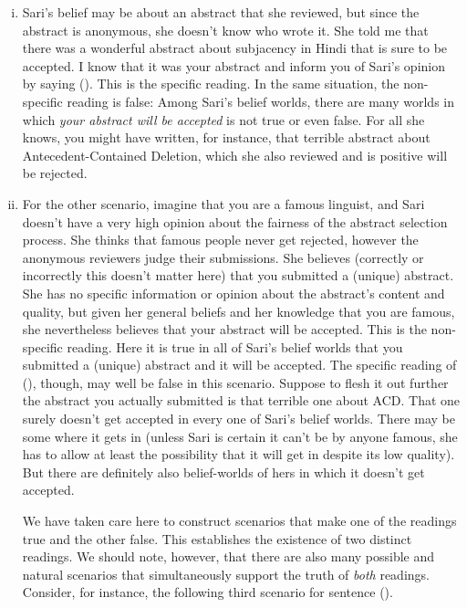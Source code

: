 \begin{enumerate}[(i)]
	
\item Sari's belief may be about an abstract that she reviewed, but since the
  abstract is anonymous, she doesn't know who wrote it. She told me that there
  was a wonderful abstract about subjacency in Hindi that is sure to be
  accepted. I know that it was your abstract and inform you of Sari's opinion by
  saying (\lastx). This is the specific reading. In the same situation, the
  non-specific reading is false: Among Sari's belief worlds, there are many
  worlds in which \emph{your abstract will be accepted} is not true or even
  false. For all she knows, you might have written, for instance, that terrible
  abstract about Antecedent-Contained Deletion, which she also reviewed and is
  positive will be rejected.
	
\item For the other scenario, imagine that you are a famous linguist, and Sari
  doesn't have a very high opinion about the fairness of the abstract selection
  process. She thinks that famous people never get rejected, however the
  anonymous reviewers judge their submissions. She believes (correctly or
  incorrectly \dash this doesn't matter here) that you submitted a (unique)
  abstract. She has no specific information or opinion about the abstract's
  content and quality, but given her general beliefs and her knowledge that you
  are famous, she nevertheless believes that your abstract will be accepted.
  This is the non-specific reading. Here it is true in all of Sari's belief
  worlds that you submitted a (unique) abstract and it will be accepted. The
  specific reading of (\lastx), though, may well be false in this scenario.
  Suppose \dash to flesh it out further \dash the abstract you actually
  submitted is that terrible one about ACD. That one surely doesn't get accepted
  in every one of Sari's belief worlds. There may be some where it gets in
  (unless Sari is certain it can't be by anyone famous, she has to allow at
  least the possibility that it will get in despite its low quality). But there
  are definitely also belief-worlds of hers in which it doesn't get accepted.
	
	We have taken care here to construct scenarios that make one of the readings
  true and the other false. This establishes the existence of two distinct
  readings. We should note, however, that there are also many possible and
  natural scenarios that simultaneously support the truth of \emph{both}
  readings. Consider, for instance, the following third scenario for sentence
  (\lastx).
	

\end{enumerate}
